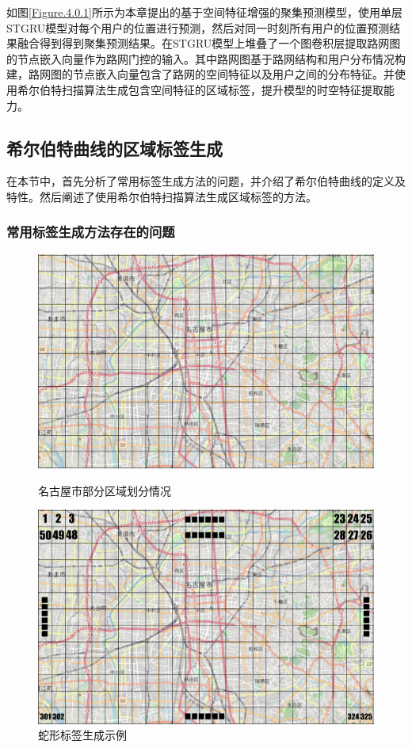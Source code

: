 \documentclass[master]{thesis-uestc}
\begin{document}
如图\ref{Figure.4.0.1}所示为本章提出的基于空间特征增强的聚集预测模型，使用单层STGRU模型对每个用户的位置进行预测，然后对同一时刻所有用户的位置预测结果融合得到得到聚集预测结果。在STGRU模型上堆叠了一个图卷积层提取路网图的节点嵌入向量作为路网门控的输入。其中路网图基于路网结构和用户分布情况构建，路网图的节点嵌入向量包含了路网的空间特征以及用户之间的分布特征。并使用希尔伯特扫描算法生成包含空间特征的区域标签，提升模型的时空特征提取能力。

\subsection{希尔伯特曲线的区域标签生成}
在本节中，首先分析了常用标签生成方法的问题，并介绍了希尔伯特曲线的定义及特性。然后阐述了使用希尔伯特扫描算法生成区域标签的方法。

\subsubsection{常用标签生成方法存在的问题}
\begin{figure}[!ht]
\centering 
\begin{minipage}[b]{0.45\textwidth}
\centering
\includegraphics[scale=0.25]{./pic/grid0.png}
\caption{名古屋市部分区域划分情况}
\label{Figure.4.1.1}
\end{minipage}
\begin{minipage}[b]{0.45\textwidth} 
\centering 
\includegraphics[scale=0.25]{./pic/grid1.png}
\caption{蛇形标签生成示例}
\label{Figure.4.1.2}
\end{minipage}
\end{figure}
\end{document}
